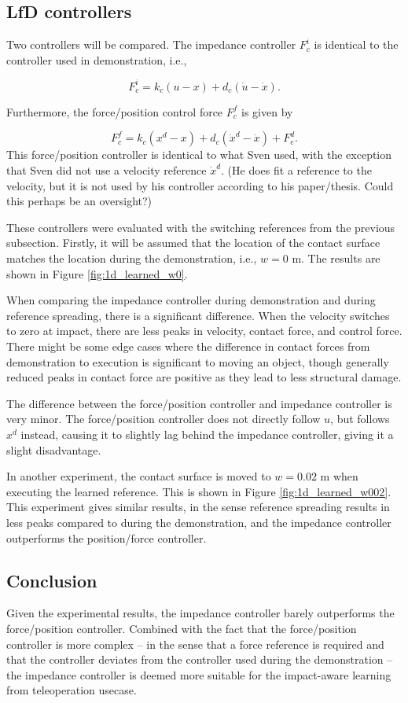 \documentclass[11pt]{report}
\numberwithin{equation}{section}        %
\numberwithin{figure}{section}          %
\numberwithin{table}{section}           %
\begin{document}
  \subsection{LfD controllers}
  Two controllers will be compared. The impedance controller $F_c^i$ is identical to the controller used in demonstration, i.e.,

  $$ F_c^i = k_c(u-x)+d_c(\dot{u}-\dot{x}).$$

  Furthermore, the force/position control force $F_c^f$ is given by

  $$ F_c^f = k_c(x^d-x)+d_c(\dot{x}^d-\dot{x}) + F_e^d.$$  
  This force/position controller is identical to what Sven used, with the exception that Sven did not use a velocity reference $\dot{x}^d$. (He does fit a reference to the velocity, but it is not used by his controller according to his paper/thesis. Could this perhaps be an oversight?)

  These controllers were evaluated with the switching references from the previous subsection. Firstly, it will be assumed that the location of the contact surface matches the location during the demonstration, i.e., $w=0$ m. The results are shown in Figure \ref{fig:1d_learned_w0}.

  When comparing the impedance controller during demonstration and during reference spreading, there is a significant difference. When the velocity switches to zero at impact, there are less peaks in velocity, contact force, and control force. There might be some edge cases where the difference in contact forces from demonstration to execution is significant to moving an object, though generally reduced peaks in contact force are positive as they lead to less structural damage.

  The difference between the force/position controller and impedance controller is very minor. The force/position controller does not directly follow $u$, but follows $x^d$ instead, causing it to slightly lag behind the impedance controller, giving it a slight disadvantage.

  In another experiment, the contact surface is moved to $w=0.02$ m when executing the learned reference. This is shown in Figure \ref{fig:1d_learned_w002}. This experiment gives similar results, in the sense reference spreading results in less peaks compared to during the demonstration, and the impedance controller outperforms the position/force controller.

  \subsection{Conclusion}
  Given the experimental results, the impedance controller barely outperforms the force/position controller. Combined with the fact that the force/position controller is more complex -- in the sense that a force reference is required and that the controller deviates from the controller used during the demonstration -- the impedance controller is deemed more suitable for the impact-aware learning from teleoperation usecase.
\end{document}
